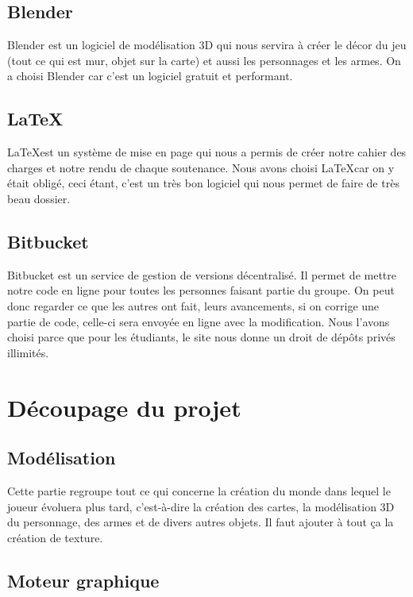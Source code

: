 \documentclass[a4paper, 11pt]{report}
\begin{document}
\subsection{Blender}\label{blender}

Blender est un logiciel de modélisation 3D qui nous servira à créer le décor du jeu (tout ce qui est mur, objet sur la carte) et aussi les personnages et les armes. On a choisi Blender car c'est un logiciel gratuit et performant.

\subsection{\LaTeX}\label{latex}

\LaTeX est un système de mise en page qui nous a permis de créer notre cahier des charges et notre rendu de chaque soutenance. Nous avons choisi \LaTeX car on y était obligé, ceci étant, c'est un très bon logiciel qui nous permet de faire de très beau dossier.

\subsection{Bitbucket}\label{bitbucket}

Bitbucket est un service de gestion de versions décentralisé. Il permet de mettre notre code en ligne pour toutes les personnes faisant partie du groupe. On peut donc regarder ce que les autres ont fait, leurs avancements, si on corrige une partie de code, celle-ci sera envoyée en ligne avec la modification. Nous l'avons choisi parce que pour les étudiants, le site nous donne un droit de dépôts privés illimités.

\newpage
\section{Découpage du projet}\label{duxe9coupage-du-projet}

\subsection{Modélisation}\label{moduxe9lisation}

Cette partie regroupe tout ce qui concerne la création du monde dans lequel le joueur évoluera plus tard, c'est-à-dire la création des cartes, la modélisation 3D du personnage, des armes et de divers autres objets. Il faut ajouter à tout ça la création de texture.

\subsection{Moteur graphique}\label{moteur-graphique}
\end{document}
